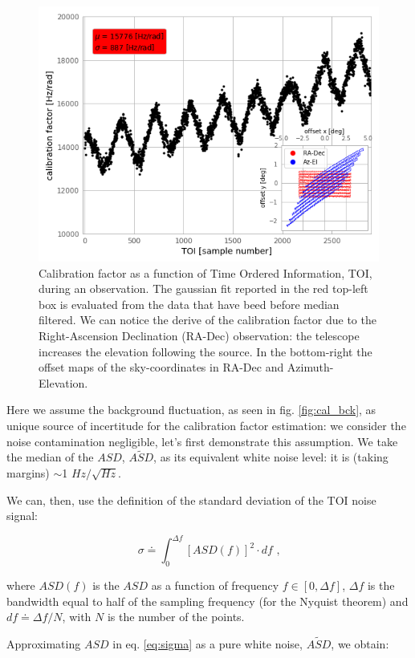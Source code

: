 \begin{figure}[htf]
	\centering
	\includegraphics[width=.7\textwidth]{4.results/calfact.png}
	\caption{Calibration factor as a function of Time Ordered Information, TOI, during an observation. The gaussian fit reported in the red top-left box is evaluated from the data that have beed before median filtered. We can notice the derive of the calibration factor due to the Right-Ascension Declination (RA-Dec) observation: the telescope increases the elevation following the source. In the bottom-right the offset maps of the sky-coordinates in RA-Dec and Azimuth-Elevation.}
	\label{fig:calfact}
\end{figure}


Here we assume the background fluctuation, as seen in fig. \ref{fig:cal_bck}, as unique source of incertitude for the calibration factor estimation: we consider the noise contamination negligible, let's first demonstrate this assumption. We take the median of the $ASD$, $\tilde{ASD}$, as its equivalent white noise level: it is (taking margins) $\sim$1 $Hz/\sqrt{Hz}$.

\noindent  We can, then, use the definition of the standard deviation of the TOI noise signal:

\begin{equation}
\sigma \doteq \int_{0}^{\Delta f} [ASD(f)]^2\cdot df \text{ ,}
\label{eq:sigma}
\end{equation}

\noindent where $ASD(f)$ is the $ASD$ as a function of frequency $f\in[0,\Delta f]$, $\Delta f$ is the bandwidth equal to half of the sampling frequency (for the Nyquist theorem) and $df\doteq\Delta f/N$, with $N$ is the number of the points.

\noindent Approximating $ASD$ in eq. \ref{eq:sigma} as a pure white noise, $\tilde{ASD}$, we obtain:

